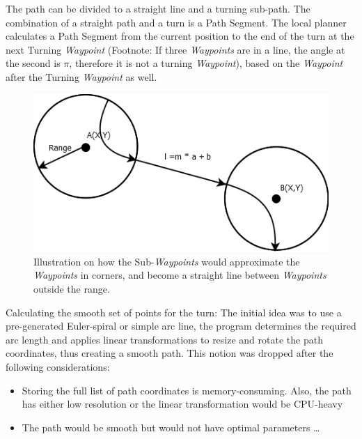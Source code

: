The path can be divided to a straight line and a turning sub-path. The combination of a straight path and a turn is a Path Segment. The local planner calculates a Path Segment from the current position to the end of the turn at the next Turning \emph{Waypoint} (Footnote: If three \emph{Waypoints} are in a line, the angle at the second is $\pi$, therefore it is not a turning \emph{Waypoint}), based on the \emph{Waypoint} after the Turning \emph{Waypoint} as well.

\begin{figure}[htbp]
\centering
\includegraphics[width = \textwidth]{img/LocalPlannerFigures/StraightRoute.png}
\caption{Illustration on how the Sub-\emph{Waypoints} would approximate the \emph{Waypoints} in corners, and become a straight line between \emph{Waypoints} outside the range.}
\label{fig:straight}
\end{figure}

Calculating the smooth set of points for the turn:
The initial idea was to use a pre-generated Euler-spiral or simple arc line, the program determines the required arc length and applies linear transformations to resize and rotate the path coordinates, thus creating a smooth path.
This notion was dropped after the following considerations:
\begin{itemize}
\item Storing the full list of path coordinates is memory-consuming. Also, the path has either low resolution or the linear transformation would be CPU-heavy
\item The path would be smooth but would not have optimal parameters \ldots
\end{itemize}

